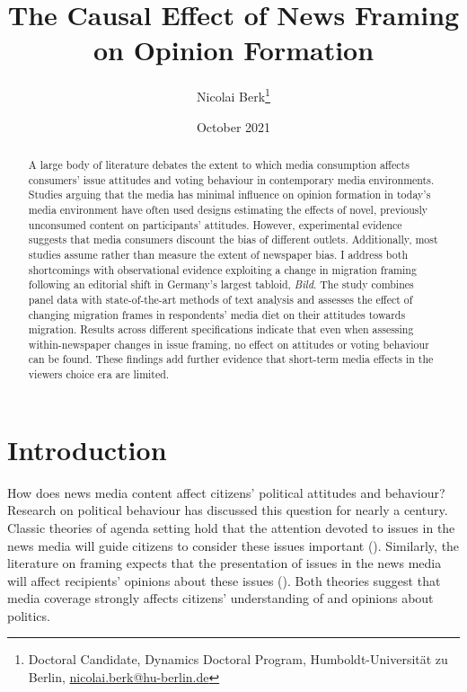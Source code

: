 \documentclass{article}
\title{The Causal Effect of News Framing on Opinion Formation}
\author{Nicolai Berk\footnote{Doctoral Candidate, Dynamics Doctoral Program, Humboldt-Universität zu Berlin, \href{mailto:nicolai.berk@hu-berlin.de}{nicolai.berk@hu-berlin.de}}}
\date{October 2021}
\begin{document}
\maketitle


\medskip

\begin{abstract}
    A large body of literature debates the extent to which media consumption affects consumers' issue attitudes and voting behaviour in contemporary media environments. Studies arguing that the media has minimal influence on opinion formation in today's media environment  have often used designs estimating the effects of novel, previously unconsumed content on participants' attitudes. However, experimental evidence suggests that media consumers discount the bias of different outlets. Additionally, most studies assume rather than measure the extent of newspaper bias. I address both shortcomings with observational evidence exploiting a change in migration framing following an editorial shift in Germany's largest tabloid, \textit{Bild}. The study combines panel data with state-of-the-art methods of text analysis and assesses the effect of changing migration frames in respondents' media diet on their attitudes towards migration. Results across different specifications indicate that even when assessing within-newspaper changes in issue framing, no effect on attitudes or voting behaviour can be found. These findings add further evidence that short-term media effects in the viewers choice era are limited.
\end{abstract}


\section{Introduction}


How does news media content affect citizens' political attitudes and behaviour? Research on political behaviour has discussed this question for nearly a century. Classic theories of agenda setting hold that the attention devoted to issues in the news media will guide citizens to consider these issues important (\cite{McCombs1972}). Similarly, the literature on framing expects that the presentation of issues in the news media will affect recipients' opinions about these issues (\cite{Nelson1997}). Both theories suggest that media coverage strongly affects citizens' understanding of and opinions about politics.
\end{document}
